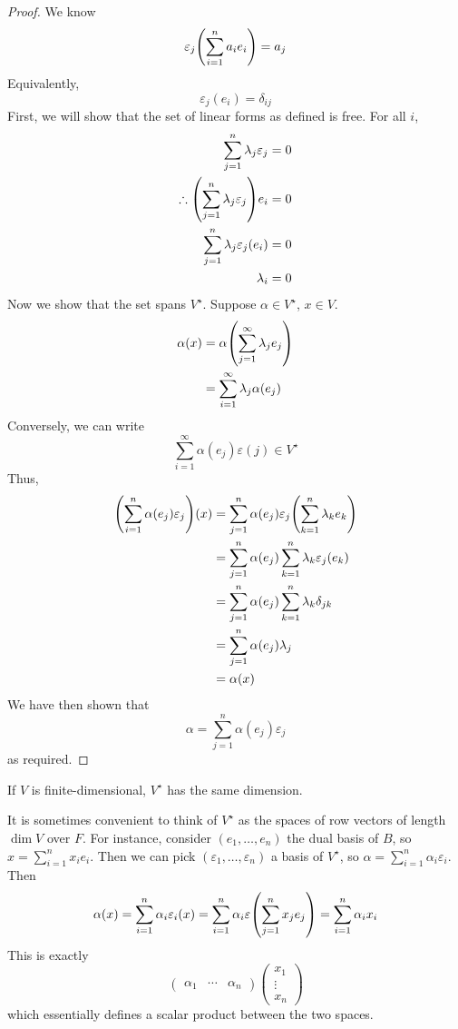 \begin{proof}
	We know
	\[ \varepsilon_j \qty( \sum_{i=1}^n a_i e_i ) = a_j \]
	Equivalently,
	\[ \varepsilon_j (e_i) = \delta_{ij} \]
	First, we will show that the set of linear forms as defined is free.
	For all \( i \),
	\begin{align*}
		\sum_{j=1}^n \lambda_j \varepsilon_j &= 0 \\
		\therefore \qty( \sum_{j=1}^n \lambda_j \varepsilon_j ) e_i &= 0 \\
		\sum_{j=1}^n \lambda_j \varepsilon_j(e_i) &= 0 \\
		\lambda_i &= 0
	\end{align*}
	Now we show that the set spans \( V^\star \).
	Suppose \( \alpha \in V^\star \), \( x \in V \).
	\begin{align*}
		\alpha(x) &= \alpha\qty(\sum_{j=1}^\infty \lambda_j e_j) \\
		&= \sum_{i=1}^\infty \lambda_j \alpha(e_j)
	\end{align*}
	Conversely, we can write
	\[ \sum_{i=1}^\infty \alpha(e_j) \varepsilon(j) \in V^\star \]
	Thus,
	\begin{align*}
		\qty( \sum_{i=1}^n \alpha(e_j) \varepsilon_j) (x) &= \sum_{j=1}^n \alpha(e_j) \varepsilon_j\qty(\sum_{k=1}^n \lambda_k e_k) \\
		&= \sum_{j=1}^n \alpha(e_j) \sum_{k=1}^n \lambda_k \varepsilon_j(e_k) \\
		&= \sum_{j=1}^n \alpha(e_j) \sum_{k=1}^n \lambda_k \delta_{jk} \\
		&= \sum_{j=1}^n \alpha(e_j) \lambda_j \\
		&= \alpha(x)
	\end{align*}
	We have then shown that
	\[ \alpha = \sum_{j=1}^n \alpha(e_j) \varepsilon_j \]
	as required.
\end{proof}
\begin{corollary}
	If \( V \) is finite-dimensional, \( V^\star \) has the same dimension.
\end{corollary}
\begin{remark}
	It is sometimes convenient to think of \( V^\star \) as the spaces of row vectors of length \( \dim V \) over \( F \).
	For instance, consider \( (e_1, \dots, e_n) \) the dual basis of \( B \), so \( x = \sum_{i=1}^n x_i e_i \).
	Then we can pick \( (\varepsilon_1, \dots, \varepsilon_n) \) a basis of \( V^\star \), so \( \alpha = \sum_{i=1}^n \alpha_i \varepsilon_i \).
	Then
	\[ \alpha(x) = \sum_{i=1}^n \alpha_i \varepsilon_i(x) = \sum_{i=1}^n \alpha_i \varepsilon\qty(\sum_{j=1}^n x_j e_j) = \sum_{i=1}^n \alpha_i x_i \]
	This is exactly
	\[ \begin{pmatrix} \alpha_1 & \cdots & \alpha_n \end{pmatrix} \begin{pmatrix} x_1 \\ \vdots \\ x_n \end{pmatrix} \]
	which essentially defines a scalar product between the two spaces.
\end{remark}

